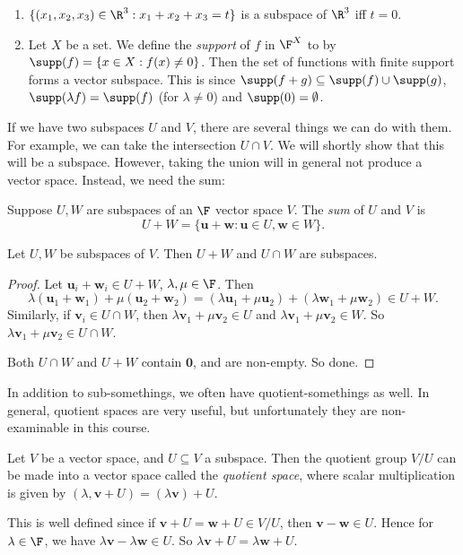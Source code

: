 \documentclass[a4paper]{article}
\begin{document}
\begin{eg}\leavevmode
  \begin{enumerate}
    \item $\{(x_1, x_2, x_3) \in \R^3: x_1 + x_2 + x_3 = t\}$ is a subspace of $\R^3$ iff $t = 0$.
    \item Let $X$ be a set. We define the \emph{support} of $f$ in $\F^X$ to by $\supp(f) = \{x\in X: f(x) \not= 0\}$. Then the set of functions with finite support forms a vector subspace. This is since $\supp (f + g) \subseteq \supp(f) \cup \supp(g)$, $\supp (\lambda f) = \supp (f)$ (for $\lambda \not= 0$) and $\supp (0) = \emptyset$.
  \end{enumerate}
\end{eg}

If we have two subspaces $U$ and $V$, there are several things we can do with them. For example, we can take the intersection $U\cap V$. We will shortly show that this will be a subspace. However, taking the union will in general not produce a vector space. Instead, we need the sum:

\begin{defi}
  Suppose $U, W$ are subspaces of an $\F$ vector space $V$. The \emph{sum} of $U$ and $V$ is
  \[
    U + W = \{\mathbf{u} + \mathbf{w}: \mathbf{u}\in U, \mathbf{w}\in W\}.
  \]
\end{defi}

\begin{prop}
  Let $U, W$ be subspaces of $V$. Then $U + W$ and $U\cap W$ are subspaces.
\end{prop}

\begin{proof}
  Let $\mathbf{u}_i + \mathbf{w}_i \in U + W$, $\lambda, \mu\in \F$. Then
  \[
    \lambda(\mathbf{u}_1 + \mathbf{w}_1) + \mu(\mathbf{u}_2 + \mathbf{w}_2) = (\lambda\mathbf{u}_1 + \mu\mathbf{u}_2) + (\lambda\mathbf{w}_1 + \mu\mathbf{w}_2) \in U + W.
  \]
  Similarly, if $\mathbf{v}_i \in U\cap W$, then $\lambda \mathbf{v}_1 + \mu \mathbf{v}_2\in U$ and $\lambda \mathbf{v}_1 + \mu \mathbf{v}_2\in W$. So $\lambda \mathbf{v}_1 + \mu \mathbf{v}_2\in U\cap W$.

  Both $U\cap W$ and $U + W$ contain $\mathbf{0}$, and are non-empty. So done.
\end{proof}

In addition to sub-somethings, we often have quotient-somethings as well. In general, quotient spaces are very useful, but unfortunately they are non-examinable in this course.
\begin{defi}
  Let $V$ be a vector space, and $U\subseteq V$ a subspace. Then the quotient group $V/U$ can be made into a vector space called the \emph{quotient space}, where scalar multiplication is given by $(\lambda, \mathbf{v} + U) = (\lambda \mathbf{v}) + U$.

  This is well defined since if $\mathbf{v} + U = \mathbf{w} + U\in V/U$, then $\mathbf{v} - \mathbf{w} \in U$. Hence for $\lambda \in \F$, we have $\lambda \mathbf{v} - \lambda \mathbf{w} \in U$. So $\lambda \mathbf{v} + U = \lambda \mathbf{w} + U$.
\end{defi}
\end{document}
